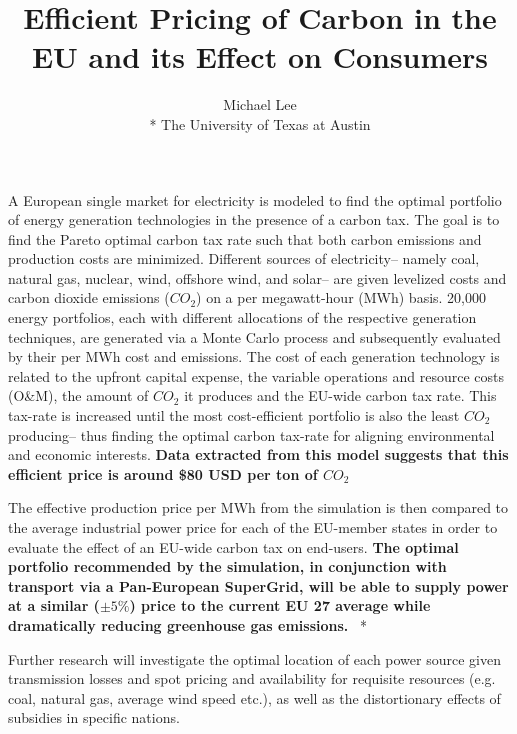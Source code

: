\documentclass{article}
\title{Efficient Pricing of Carbon in the EU and its Effect on Consumers}
\author{Michael Lee \\*
The University of Texas at Austin}
\begin{document}
\onehalfspacing
\maketitle{}
A European single market for electricity is modeled to find the optimal portfolio of energy generation technologies in the presence of a carbon tax. The goal is to find the Pareto optimal carbon tax rate such that both carbon emissions and production costs are minimized. Different sources of electricity-- namely coal, natural gas, nuclear, wind, offshore wind, and solar-- are given levelized costs and carbon dioxide emissions ($CO_{2}$) on a per megawatt-hour (MWh) basis. 20,000 energy portfolios, each with different allocations of the respective generation techniques, are generated via a Monte Carlo process and subsequently evaluated by their per MWh cost and emissions. The cost of each generation technology is related to the upfront capital expense, the variable operations and resource costs (O\&M), the amount of $CO_{2}$ it produces and the EU-wide carbon tax rate. This tax-rate is increased until the most cost-efficient portfolio is also the least $CO_{2}$ producing-- thus finding the optimal carbon tax-rate for aligning environmental and economic interests. {\bf Data extracted from this model suggests that this efficient price is around \$80 USD per ton of $CO_{2}$}\*

The effective production price per MWh from the simulation is then compared to the average industrial power price for each of the EU-member states in order to evaluate the effect of an EU-wide carbon tax on end-users. {\bf The optimal portfolio recommended by the simulation, in conjunction with transport via a Pan-European SuperGrid, will be able to supply power at a similar ($\pm 5\%$) price to the current EU 27 average while dramatically reducing greenhouse gas emissions.}  \
*


Further research will investigate the optimal location of each power source given transmission losses and spot pricing and availability for requisite resources (e.g. coal, natural gas, average wind speed etc.), as well as the distortionary effects of subsidies in specific nations.
\end{document}
